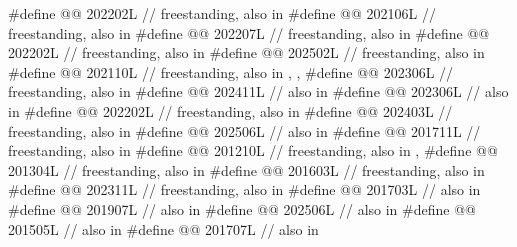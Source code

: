 \begin{codeblock}
#define @@                      202202L // freestanding, also in 
#define @@           202106L // freestanding, also in 
#define @@                     202207L // freestanding, also in 
#define @@               202202L // freestanding, also in 
#define @@                   202502L // freestanding, also in 
#define @@                        202110L
  // freestanding, also in , , 
#define @@                             202306L // freestanding, also in 
#define @@             202411L // also in 
#define @@                               202306L // also in 
#define @@          202202L // freestanding, also in 
#define @@                 202403L // freestanding, also in 
#define @@                        202506L // also in 
#define @@                      201711L // freestanding, also in 
#define @@                  201210L
  // freestanding, also in , 
#define @@       201304L // freestanding, also in 
#define @@                            201603L // freestanding, also in 
#define @@             202311L // freestanding, also in 
#define @@                       201703L // also in 
#define @@                         201907L // also in 
#define @@                           202506L // also in 
#define @@                      201505L // also in 
#define @@                 201707L // also in 

\end{codeblock}
